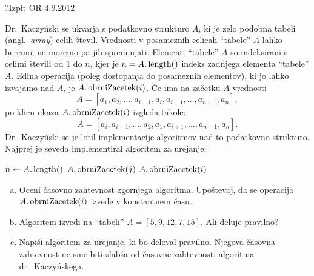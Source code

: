 \begin{naloga}{?}{Izpit OR 4.9.2012}
\begin{vprasanje}
Dr.~Kaczyński se ukvarja s podatkovno strukturo $A$,
ki je zelo podobna tabeli (angl.~{\em array}) celih števil.
Vrednosti v posameznih celicah ``tabele'' $A$ lahko beremo,
ne moremo pa jih spreminjati.
Elementi ``tabele'' $A$ so indeksirani s celimi števili od $1$ do $n$,
kjer je $n = A.\operatorname{length}()$ indeks zadnjega elementa ``tabele'' $A$.
Edina operacija (poleg dostopanja do posameznih elementov),
ki jo lahko izvajamo nad $A$, je $A.\operatorname{obrniZacetek}(i)$.
Če ima na začetku $A$ vrednosti
$$
A = [a_1, a_2, \dots, a_{i-1}, a_i, a_{i+1}, \dots, a_{n-1}, a_n],
$$
po klicu ukaza $A.\operatorname{obrniZacetek}(i)$ izgleda takole:
$$
A = [a_i, a_{i-1}, \dots, a_2, a_1, a_{i+1}, \dots, a_{n-1}, a_n] .
$$
Dr.~Kaczyński se je lotil implementacije algoritmov
nad to podatkovno strukturo.
Najprej je seveda implementiral algoritem za urejanje:
\begin{small}
\begin{algorithmic}
\State $n \gets A.\operatorname{length}()$
            \State $A.\operatorname{obrniZacetek}(j)$
            \State $A.\operatorname{obrniZacetek}(i)$
        \EndIf
    \EndFor
\EndFor
\end{algorithmic}
\end{small}

\begin{enumerate}[(a)]
\item Oceni časovno zahtevnost zgornjega algoritma.
Upoštevaj, da se operacija $A.\operatorname{obrniZacetek}(i)$ izvede v konstantnem času.

\item Algoritem izvedi na ``tabeli'' $A = [5, 9, 12, 7, 15]$.
Ali deluje pravilno?

\item Napiši algoritem za urejanje, ki bo deloval pravilno.
Njegova časovna zahtevnost ne sme biti slabša
od časovne zahtevnosti algoritma dr.~Kaczyńskega.
\end{enumerate}
\end{vprasanje}
\begin{odgovor}
\end{odgovor}
\end{naloga}
